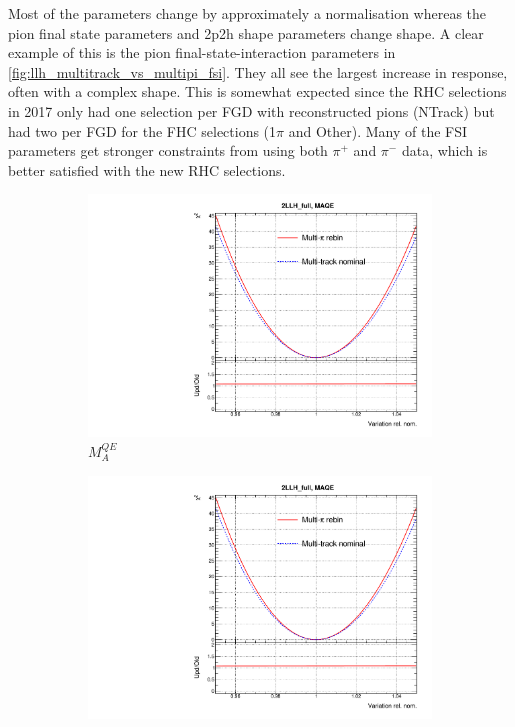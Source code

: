 Most of the parameters change by approximately a normalisation whereas the pion final state parameters and 2p2h shape parameters change shape. A clear example of this is the pion final-state-interaction parameters in \autoref{fig:llh_multitrack_vs_multipi_fsi}. They all see the largest increase in response, often with a complex shape. This is somewhat expected since the RHC selections in 2017 only had one selection per FGD with reconstructed pions (NTrack) but had two per FGD for the FHC selections (1$\pi$ and Other). Many of the FSI parameters get stronger constraints from using both $\pi^+$ and $\pi^-$ data, which is better satisfied with the new RHC selections.
\begin{figure}[h]
	\centering
	\begin{subfigure}[t]{0.32\textwidth}
		\includegraphics[width=\textwidth,page=1, trim={0mm 0mm 0mm 9mm}, clip]{figures/mach3/2018/llh/MultiPi_vs_MultiTrack_TotalLLH}
		\caption{$M_A^{QE}$}
	\end{subfigure}
	\begin{subfigure}[t]{0.32\textwidth}
		\includegraphics[width=\textwidth,page=4, trim={0mm 0mm 0mm 9mm}, clip]{figures/mach3/2018/llh/MultiPi_vs_MultiTrack_TotalLLH}

\end{subfigure}
\end{figure}
